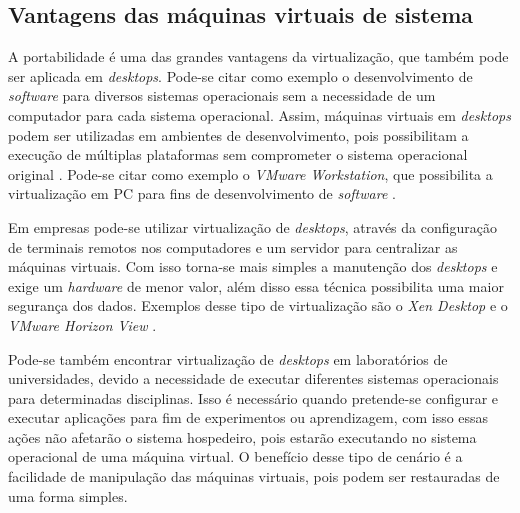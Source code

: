 \subsection{Vantagens das máquinas virtuais de sistema}
\label{section:virtvantag}

A portabilidade é uma das grandes vantagens da virtualização, que também pode ser aplicada em \textit{desktops}. Pode-se citar como exemplo 
o desenvolvimento de \textit{software} para diversos sistemas operacionais sem a necessidade de um computador para cada sistema operacional. 
Assim, máquinas virtuais em \textit{desktops} podem ser utilizadas em ambientes de desenvolvimento, pois possibilitam a execução de múltiplas 
plataformas sem comprometer o sistema operacional original \cite{carissimi2008}. Pode-se citar como exemplo o \textit{VMware Workstation}, que 
possibilita a virtualização em \ac{PC} para fins de desenvolvimento de \textit{software} \cite{vmware2016}.

Em empresas pode-se utilizar virtualização de \textit{desktops}, através da configuração de terminais remotos nos computadores e um servidor 
para centralizar as máquinas virtuais. Com isso torna-se mais simples a manutenção dos \textit{desktops} e exige um \textit{hardware} de 
menor valor, além disso essa técnica possibilita uma maior segurança dos dados. Exemplos desse tipo de virtualização são o \textit{Xen Desktop}
\cite{xendesktop} e o \textit{VMware Horizon View} \cite{vmwareview}.

Pode-se também encontrar virtualização de \textit{desktops} em laboratórios de universidades, devido a necessidade de executar diferentes sistemas 
operacionais para determinadas disciplinas. Isso é necessário quando pretende-se configurar e executar aplicações para fim de experimentos ou
aprendizagem, com isso essas ações não afetarão o sistema hospedeiro, pois estarão executando no sistema operacional de uma máquina virtual. 
O benefício desse tipo de cenário é a facilidade de manipulação das máquinas virtuais, pois podem ser restauradas de uma forma simples.

